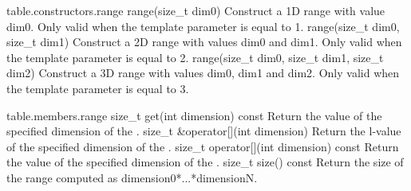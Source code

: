 
{table.constructors.range}
  \addRow
    {range(size_t dim0)}
    {
        Construct a 1D range with value dim0.
        Only valid when the template parameter  is equal
          to 1.
    }
  \addRow
    {range(size_t dim0, size_t dim1)}
    {
        Construct a 2D range with values dim0 and dim1.
        Only valid when the template parameter  is equal
        to 2.
    }
  \addRow
    {range(size_t dim0, size_t dim1, size_t dim2)}
    {
        Construct a 3D range with values dim0, dim1 and dim2.
        Only valid when the template parameter  is equal
  to 3.
    }
\completeTable

{table.members.range}
  \addRow
    {size_t get(int dimension) const}
    {
        Return the value of the specified dimension of the
        .
    }
  \addRow
    {size_t \&operator[](int dimension)}
    {
        Return the l-value of the specified dimension of the
        .
    }
  \addRow
    {size_t operator[](int dimension) const}
    {
        Return the value of the specified dimension of the
        .
    }
  \addRow
    {size_t size() const}
    {
        Return the size of the range computed as dimension0*...*dimensionN.
    }

\completeTable

